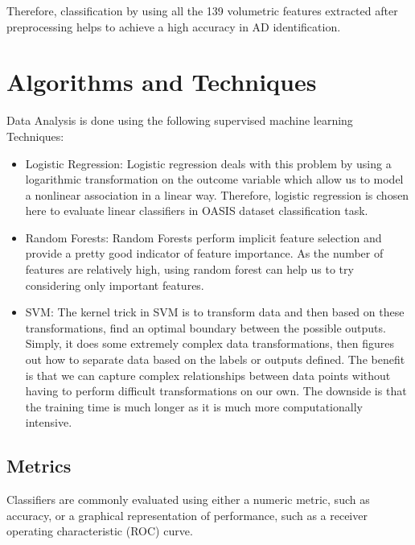 Therefore, classification by using all the 139 volumetric features extracted after preprocessing helps to achieve a high accuracy in AD identification.


\section{Algorithms and Techniques}
\label{sec:Alg}
Data Analysis is done using the following supervised machine learning Techniques:

\begin{itemize}
	\item Logistic Regression:
	Logistic regression deals with this problem by using a 
	logarithmic transformation on the outcome variable 
	which allow us to model a nonlinear association in a 
	linear way. Therefore, logistic regression is chosen here to evaluate linear classifiers in OASIS dataset classification task.
	
	\item Random Forests: Random Forests perform implicit feature selection and provide a pretty good indicator of feature importance. As the number of features are relatively high, using random forest can help us to try considering only important features.
	
	\item SVM: The kernel trick in SVM is to transform data and then based on these transformations, find an optimal boundary between the possible outputs. Simply, it does some extremely complex data transformations, then figures out how to separate data based on the labels or outputs defined. The benefit is that we can capture complex relationships between data points without having to perform difficult transformations on our own. The downside is that the training time is much longer as it is much more computationally intensive.
\end{itemize}


\subsection{Metrics}
Classifiers are commonly evaluated using either a numeric metric, such as accuracy, or a graphical representation of performance, such as a receiver operating characteristic (ROC) curve.

